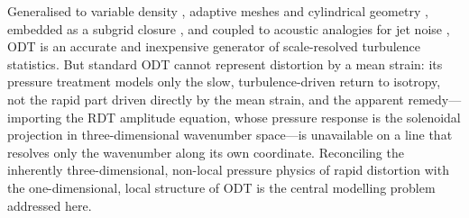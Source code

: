 \documentclass[lineno]{JFM-FLM_Au}
\begin{document}
Generalised to variable density
\citep{AshurstKerstein2005}, adaptive meshes \citep{Lignell2013,
StephensLignell2021} and cylindrical geometry \citep{Lignell2018},
embedded as a subgrid closure \citep{SchmidtKerstein2010}, and coupled
to acoustic analogies for jet noise
\citep{SharmaKleinSchmidt2022,MedinaMendez2023}, ODT is an accurate and
inexpensive generator of scale-resolved turbulence statistics. But standard ODT
cannot represent distortion by a mean strain: its pressure treatment
models only the slow, turbulence-driven return to isotropy, not the
rapid part driven directly by the mean strain, and the
apparent remedy---importing the RDT amplitude equation, whose pressure
response is the solenoidal projection in three-dimensional wavenumber
space---is unavailable on a line that resolves only the wavenumber along
its own coordinate. Reconciling the inherently three-dimensional,
non-local pressure physics of rapid distortion with the one-dimensional,
local structure of ODT is the central modelling problem addressed here.
\end{document}
